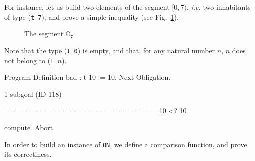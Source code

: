 \label{def: Finite-ord-type}



For instance, let us build two elements of the segment $[0, 7)$, \emph{i.e.} two
inhabitants of   type (\texttt{t 7}), and prove a simple  inequality (see Fig.~\ref{fig:O7}).

\begin{figure}[h]
\centering
{}

\caption{The segment $\mathbb{O}_7$\label{fig:O7}}
\end{figure}
  






Note that the type (\texttt{t 0}) is empty, and that, for any natural number
 $n$, $n$ does not belong to (\texttt{t $n$}).

 

\begin{Coqsrc}
Program Definition bad : t 10 := 10.
Next Obligation.
\end{Coqsrc}

\begin{Coqanswer}
1 subgoal (ID 118)
  
  ============================
  10 <? 10 
\end{Coqanswer}

\begin{Coqsrc}
  compute.
Abort.
\end{Coqsrc}

%

 




In order to build an instance of \texttt{ON}, we define a comparison function,  and prove its correctiness.


